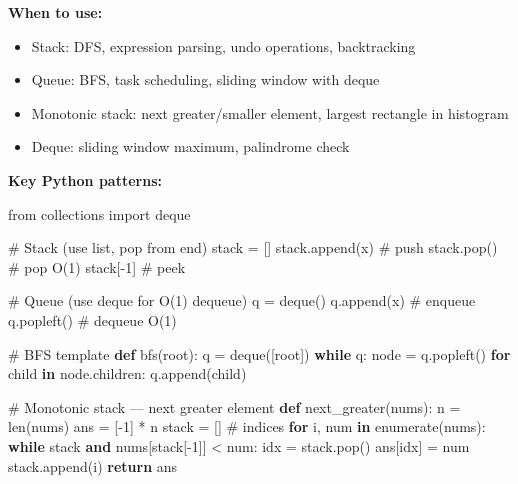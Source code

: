 \documentclass[11pt]{article}
\providecommand{\tightlist}{\setlength{\itemsep}{1pt}\setlength{\parskip}{0pt}}
\newenvironment{Shaded}{\begin{snugshade}}{\end{snugshade}}
\newcommand{\BuiltInTok}[1]{\textcolor[rgb]{0.50,0.55,0.55}{#1}}
\newcommand{\CommentTok}[1]{\textcolor[rgb]{0.48,0.49,0.49}{#1}}
\newcommand{\ControlFlowTok}[1]{\textcolor[rgb]{0.99,0.74,0.29}{\textbf{#1}}}
\newcommand{\DecValTok}[1]{\textcolor[rgb]{0.96,0.45,0.00}{#1}}
\newcommand{\ImportTok}[1]{\textcolor[rgb]{0.15,0.68,0.38}{#1}}
\newcommand{\KeywordTok}[1]{\textcolor[rgb]{0.81,0.81,0.76}{\textbf{#1}}}
\newcommand{\NormalTok}[1]{\textcolor[rgb]{0.81,0.81,0.76}{#1}}
\newcommand{\OperatorTok}[1]{\textcolor[rgb]{0.81,0.81,0.76}{#1}}
\begin{document}
\textbf{When to use:}

\begin{itemize}
\tightlist
\item
  Stack: DFS, expression parsing, undo operations, backtracking
\item
  Queue: BFS, task scheduling, sliding window with deque
\item
  Monotonic stack: next greater/smaller element, largest rectangle in histogram
\item
  Deque: sliding window maximum, palindrome check
\end{itemize}

\textbf{Key Python patterns:}


\begin{Shaded}
\begin{Highlighting}[]
\ImportTok{from}\NormalTok{ collections }\ImportTok{import}\NormalTok{ deque}

\CommentTok{\# Stack (use list, pop from end)}
\NormalTok{stack }\OperatorTok{=}\NormalTok{ []}
\NormalTok{stack.append(x)    }\CommentTok{\# push}
\NormalTok{stack.pop()        }\CommentTok{\# pop O(1)}
\NormalTok{stack[}\OperatorTok{{-}}\DecValTok{1}\NormalTok{]          }\CommentTok{\# peek}

\CommentTok{\# Queue (use deque for O(1) dequeue)}
\NormalTok{q }\OperatorTok{=}\NormalTok{ deque()}
\NormalTok{q.append(x)        }\CommentTok{\# enqueue}
\NormalTok{q.popleft()        }\CommentTok{\# dequeue O(1)}

\CommentTok{\# BFS template}
\KeywordTok{def}\NormalTok{ bfs(root):}
\NormalTok{    q }\OperatorTok{=}\NormalTok{ deque([root])}
    \ControlFlowTok{while}\NormalTok{ q:}
\NormalTok{        node }\OperatorTok{=}\NormalTok{ q.popleft()}
        \ControlFlowTok{for}\NormalTok{ child }\KeywordTok{in}\NormalTok{ node.children:}
\NormalTok{            q.append(child)}

\CommentTok{\# Monotonic stack — next greater element}
\KeywordTok{def}\NormalTok{ next\_greater(nums):}
\NormalTok{    n }\OperatorTok{=} \BuiltInTok{len}\NormalTok{(nums)}
\NormalTok{    ans }\OperatorTok{=}\NormalTok{ [}\OperatorTok{{-}}\DecValTok{1}\NormalTok{] }\OperatorTok{*}\NormalTok{ n}
\NormalTok{    stack }\OperatorTok{=}\NormalTok{ []  }\CommentTok{\# indices}
    \ControlFlowTok{for}\NormalTok{ i, num }\KeywordTok{in} \BuiltInTok{enumerate}\NormalTok{(nums):}
        \ControlFlowTok{while}\NormalTok{ stack }\KeywordTok{and}\NormalTok{ nums[stack[}\OperatorTok{{-}}\DecValTok{1}\NormalTok{]] }\OperatorTok{\textless{}}\NormalTok{ num:}
\NormalTok{            idx }\OperatorTok{=}\NormalTok{ stack.pop()}
\NormalTok{            ans[idx] }\OperatorTok{=}\NormalTok{ num}
\NormalTok{        stack.append(i)}
    \ControlFlowTok{return}\NormalTok{ ans}


\end{Highlighting}
\end{Shaded}
\end{document}
